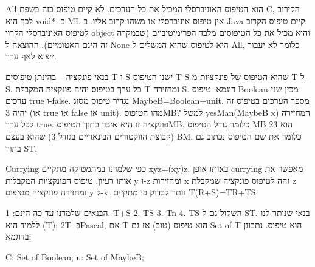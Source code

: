       All הוא הטיפוס האוניברסלי המכיל את כל הערכים. לא קיים טיפוס כזה בשפת C, הקירוב לכך הוא void*. ב-ML אין טיפוס אוניברסלי או משהו קרוב אליו. ב-Java קיים טיפוס הקרוב לטיפוס האוניברסלי הקרוי object והוא מכיל את כל הטיפוסים מלבד הפרימיטיביים (שבמקרה זה הינם האטומיים).
      ההוצאה ל-None היא לטיפוס שהוא המשלים ל-All, כלומר לא יעבור ייצוא לאף ערך.
      \begin{ציינון}
\item בנאי פונקציה – בהינתן טיפוסים T ו-S ישנו הטיפוס T S שהוא הטיפוס של פונקציות מ-T ל-S. כל ערך בטיפוס יהיה פונקציה המקבלת T ומחזירה S.
      דוגמא:
      טיפוס Boolean מכין שני ערכים true ו-false. נגדיר טיפוס מסוג
      MaybeB=Boolean+unit. מספר הערכים בטיפוס זה יהיה 3 (או true או false או unit).
      מהו הטיפוסMB?
      למשל yesMan(MaybeB x) המחזירה לכל ערך true. פונקציה זו היא איבר בתוך הטיפוסMB.
      כלומר גודל הטיפוס MB הוא 23 (קבוצת הווקטורים הבינאריים בגודל 3) שהוא בעצם BM.
      כלומר את שם הטיפוס נכתוב גם בתור ST.
  \end{ציינון}

      Currying
      כפי שלמדנו במתמטיקה מתקיים xyz=(xy)z. באותו אופן currying מאפשר את אותו רעיון. טיפוס הפונקציות המקבלות y ו-z ומחזירות x זהה לטיפוס פונקציה שמקבלת z ומחזירה פונקציה מטיפוס y ל-x.
      נותר לבדוק כי מתקיים T(R+S)=TR+TS.

      הבנאים שלמדנו עד כה הינם:
      1. T+S
      2. TS
      3. Tn
      4. TS השקול גם ל-ST.
      בנאי שנותר לנו ללמוד הוא (T); 2T.
      בְּPascal, אם T הוא טיפוס (טוב) אז גם Set of T הוא טיפוס.
      נתבונן בדוגמא:

      C: Set of Boolean;
      u: Set of MaybeB;

